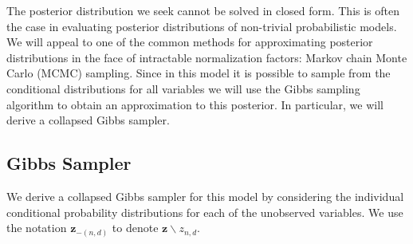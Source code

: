 \documentclass{article}
\begin{document}
The posterior distribution we seek cannot be solved in closed form. This is often the case in evaluating posterior distributions of non-trivial probabilistic models. We will appeal to one of the common methods for approximating posterior distributions in the face of intractable normalization factors: Markov chain Monte Carlo (MCMC) sampling. Since in this model it is possible to sample from the conditional distributions for all variables we will use the Gibbs sampling algorithm to obtain an approximation to this posterior. In particular, we will derive a collapsed Gibbs sampler.
%
%
%
%
\subsection{Gibbs Sampler}

We derive a collapsed Gibbs sampler for this model by considering the individual conditional probability distributions for
each of the unobserved variables.  We use the notation $\mathbf{z}_{-(n,d)}$ to denote $\mathbf{z} \backslash z_{n,d}$.
\end{document}
